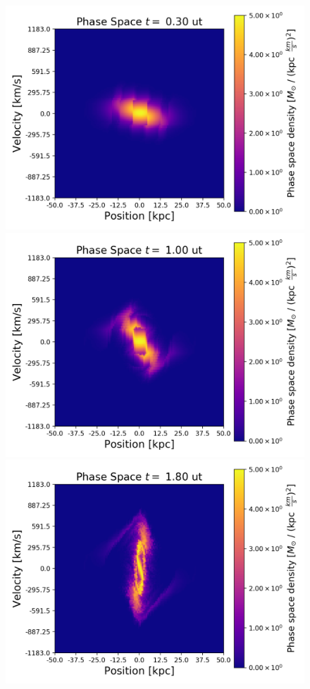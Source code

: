 {\begin{figure}[h!]
    \centering
    \includegraphics[scale=0.45]{imag/2dBad3.png}
    \includegraphics[scale=0.45]{imag/2dBad10.png}
    \includegraphics[scale=0.45]{imag/2dBad18.png}

\end{figure}}
